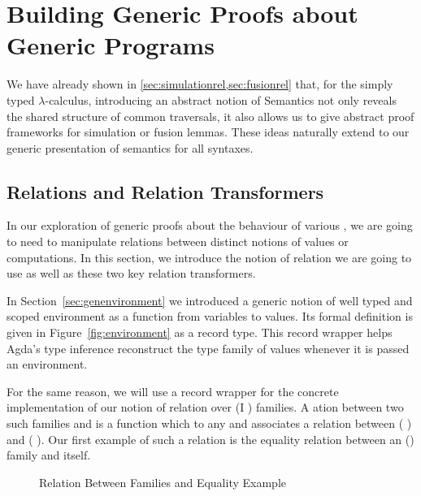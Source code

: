 

\chapter{Building Generic Proofs about Generic Programs}

We have already shown in \cref{sec:simulationrel,sec:fusionrel} that, for the
simply typed $\lambda$-calculus, introducing an abstract notion of Semantics
not only reveals the shared structure of common traversals, it also allows
us to give abstract proof frameworks for simulation or fusion lemmas. These
ideas naturally extend to our generic presentation of semantics for all syntaxes.


\section{Relations and Relation Transformers}

In our exploration of generic proofs about the behaviour of various ,
we are going to need to manipulate relations between distinct notions of values or
computations. In this section, we introduce the notion of relation we are going to
use as well as these two key relation transformers.

In Section~\ref{sec:genenvironment} we introduced a generic notion of well typed
and scoped environment as a function from variables to values. Its formal definition
is given in Figure~\ref{fig:environment} as a record type. This record wrapper helps
Agda's type inference reconstruct the type family of values whenever it is passed an
environment.

For the same reason, we will use a record wrapper for the concrete implementation of
our notion of relation over (I ) families. A ation between two
such families  and  is a function which to any  and 
associates a relation between (  ) and (  ).
Our first example of such a relation is  the equality relation between
an () family  and itself.

\begin{figure}[h]
\begin{minipage}[t]{0.65\textwidth}
\end{minipage}
\begin{minipage}[t]{0.25\textwidth}
\end{minipage}
\caption{Relation Between  Families and Equality Example\label{ex:fam-eq}}
\label{fig:reldef}
\end{figure}

